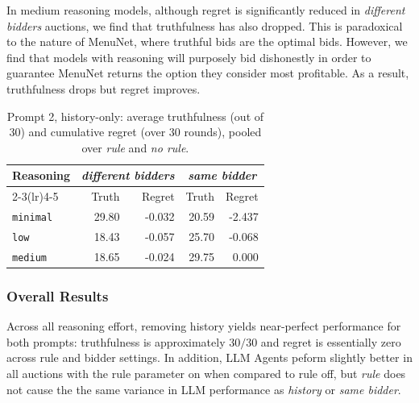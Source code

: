 \documentclass[a4paper]{article}
\begin{document}
In medium reasoning models, although regret is significantly reduced in \emph{different bidders} auctions, we find that truthfulness has also dropped. This is paradoxical to the nature of MenuNet, where truthful bids are the optimal bids. However, we find that models with reasoning will purposely bid dishonestly in order to guarantee MenuNet returns the option they consider most profitable. As a result, truthfulness drops but regret improves.


\begin{table}[H]
\centering
\begin{tabular}{lrrrr}
\toprule
Reasoning & \multicolumn{2}{c}{\emph{different bidders}} & \multicolumn{2}{c}{\emph{same bidder}} \\
\cmidrule(lr){2-3}\cmidrule(lr){4-5}
 & Truth & Regret & Truth & Regret \\
\midrule
\texttt{minimal} & 29.80 & -0.032 & 20.59 & -2.437 \\
\texttt{low}     & 18.43 & -0.057 & 25.70 & -0.068 \\
\texttt{medium}  & 18.65 & -0.024 & 29.75 &  0.000 \\
\bottomrule
\end{tabular}
\caption{Prompt 2, history-only: average truthfulness (out of 30) and cumulative regret (over 30 rounds), pooled over \emph{rule} and \emph{no rule}.}
\label{tab:prompt2_history_by_preset}
\end{table}



\FloatBarrier
\subsubsection{Overall Results}
Across all reasoning effort, removing history yields near-perfect performance for both prompts: truthfulness is approximately $30/30$ and regret is essentially zero across rule and bidder settings. In addition, LLM Agents peform slightly better in all auctions with the rule parameter on when compared to rule off, but \emph{rule} does not cause the the same variance in LLM performance as \emph{history} or \emph{same bidder}.
\end{document}
